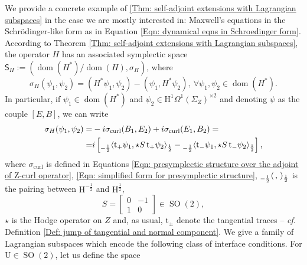 \begin{Example}
	We provide a concrete example of \ref{Thm: self-adjoint extensions with Lagrangian subspaces} in the case we are mostly interested in: Maxwell's equations in the Schr\"odinger-like form as in Equation \eqref{Eqn: dynamical eqns in Schroedinger form}. According to Theorem \ref{Thm: self-adjoint extensions with Lagrangian subspaces}, the operator $H$ has an associated symplectic space $\mathsf{S}_H:=(\operatorname{dom}(H^*)/\operatorname{dom}(H),\sigma_H)$, where
	\begin{equation}
		\sigma_H (\psi_1,\psi_2)=(H^*\psi_1,\psi_2)-(\psi_1,H^*\psi_2), \ \forall \psi_1,\psi_2\in\operatorname{dom}(H^*).
	\end{equation}
	In particular, if $\psi_1\in\operatorname{dom}(H^*)$ and $\psi_2\in\mathrm{H}^1\Omega^1(\Sigma_Z)^{\times 2}$ and denoting $\psi$ as the couple $[E,B]$, we can write
	\begin{align}
	\nonumber	\sigma_H (\psi_1,\psi_2)=&-i\sigma_{\operatorname{curl}}(B_1,E_2)+i\sigma_{\operatorname{curl}}(E_1,B_2)=\\
		=&i\left[	\prescript{}{-\frac{1}{2}}{\langle} \mathrm{t}_+\psi_1,\star S\,\mathrm{t}_+\psi_2 \rangle_\frac12-\prescript{}{-\frac{1}{2}}{\langle} \mathrm{t}_-\psi_1,\star S\,\mathrm{t}_-\psi_2 \rangle_\frac12	\right],
	\end{align}
	where $\sigma_{\operatorname{curl}}$ is defined in Equations \eqref{Eqn: presymplectic structure over the adjoint of Z-curl operator}, \eqref{Eqn: simplified form for presymplectic structure}, $\prescript{}{-\frac{1}{2}}{\langle}\,,\, \rangle_\frac12$ is the pairing between $\mathrm{H}^{-\frac12}$ and $\mathrm{H}^{\frac12}$, $$S=\begin{bmatrix}
	0 & -1\\
	1 & 0
	\end{bmatrix}\in \operatorname{SO}(2),$$ $\star$ is the Hodge operator on $Z$ and, as usual, $\mathrm{t}_\pm$ denote the tangential traces -- \emph{cf.} Definition \ref{Def: jump of tangential and normal component}.
	We give a family of Lagrangian subspaces which encode the following class of interface conditions. For $\mathrm{U}\in\operatorname{SO}(2)$, let us define the space
	

\end{Example}
